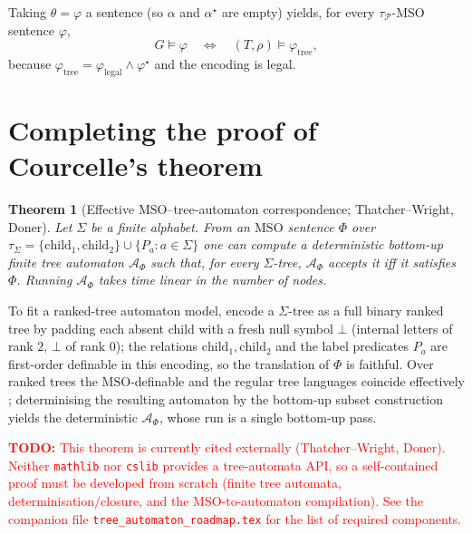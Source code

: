 \documentclass[11pt]{article}
\newtheorem{theorem}{Theorem}
\theoremstyle{definition}
\newcommand{\MSO}{\ensuremath{\mathrm{MSO}}}
\newcommand{\child}{\mathrm{child}}
\newcommand{\legal}{\mathrm{legal}}
\newcommand{\Pred}{\mathcal P}
\newcommand{\Aut}{\mathcal{A}}
\newcommand{\TODO}[1]{\textcolor{red}{\textbf{TODO:} #1}}
\begin{document}
Taking \(\theta=\varphi\) a sentence (so \(\alpha\) and \(\alpha^\star\) are empty)
yields, for every \(\tau_{\Pred}\)-MSO{} sentence \(\varphi\),
\[
  G\models\varphi
  \quad\Longleftrightarrow\quad
  (T,\rho)\models\varphi_{\mathrm{tree}},
\]
because \(\varphi_{\mathrm{tree}}=\varphi_{\legal}\wedge\varphi^\star\) and the
encoding is legal.

\section{Completing the proof of Courcelle's theorem}

\begin{theorem}[Effective \MSO{}--tree-automaton correspondence;
Thatcher--Wright, Doner]\label{thm:automata}
Let \(\Sigma\) be a finite alphabet.  From an \MSO{} sentence \(\Phi\) over
\(\tau_\Sigma=\{\child_1,\child_2\}\cup\{P_a:a\in\Sigma\}\) one can compute a
deterministic bottom-up finite tree automaton \(\Aut_\Phi\) such that, for every
\(\Sigma\)-tree, \(\Aut_\Phi\) accepts it iff it satisfies \(\Phi\).  Running
\(\Aut_\Phi\) takes time linear in the number of nodes.
\end{theorem}

To fit a ranked-tree automaton model, encode a \(\Sigma\)-tree as a full binary
ranked tree by padding each absent child with a fresh null symbol \(\bot\)
(internal letters of rank \(2\), \(\bot\) of rank \(0\)); the relations
\(\child_1,\child_2\) and the label predicates \(P_a\) are first-order definable in
this encoding, so the translation of \(\Phi\) is faithful.  Over ranked trees the
\MSO{}-definable and the regular tree languages coincide effectively
\cite{ThatcherWright1968,Doner1970,TATA}; determinising the resulting automaton by
the bottom-up subset construction yields the deterministic \(\Aut_\Phi\), whose run
is a single bottom-up pass.

\TODO{This theorem is currently cited externally (Thatcher--Wright, Doner).
Neither \texttt{mathlib} nor \texttt{cslib} provides a tree-automata API, so a
self-contained proof must be developed from scratch (finite tree automata,
determinisation/closure, and the \MSO{}-to-automaton compilation).  See the
companion file \texttt{tree\_automaton\_roadmap.tex} for the list of required
components.}
\end{document}
